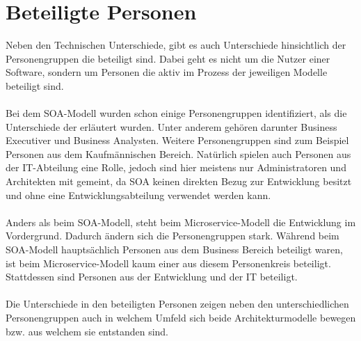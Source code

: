 \section{Beteiligte Personen}
\label{sec:FazitBeteiligtePersonen}
Neben den Technischen Unterschiede, gibt es auch Unterschiede hinsichtlich der Personengruppen die beteiligt sind. Dabei geht es nicht um die Nutzer einer Software, sondern um Personen die aktiv im Prozess der jeweiligen Modelle beteiligt sind.
\\\\
Bei dem SOA-Modell wurden schon einige Personengruppen identifiziert, als die Unterschiede der  erläutert wurden. Unter anderem gehören darunter Business Executiver und Business Analysten. Weitere Personengruppen sind zum Beispiel Personen aus dem Kaufmännischen Bereich. Natürlich spielen auch Personen aus der IT-Abteilung eine Rolle, jedoch sind hier meistens nur Administratoren und Architekten mit gemeint, da SOA keinen direkten Bezug zur Entwicklung besitzt und ohne eine Entwicklungsabteilung verwendet werden kann.
\\\\
Anders als beim SOA-Modell, steht beim Microservice-Modell die Entwicklung im Vordergrund. Dadurch ändern sich die Personengruppen stark. Während beim SOA-Modell hauptsächlich Personen aus dem Business Bereich beteiligt waren, ist beim Microservice-Modell kaum einer aus diesem Personenkreis beteiligt. Stattdessen sind Personen aus der Entwicklung und der IT beteiligt.
\\\\
Die Unterschiede in den beteiligten Personen zeigen neben den unterschiedlichen Personengruppen auch in welchem Umfeld sich beide Architekturmodelle bewegen bzw. aus welchem sie entstanden sind.